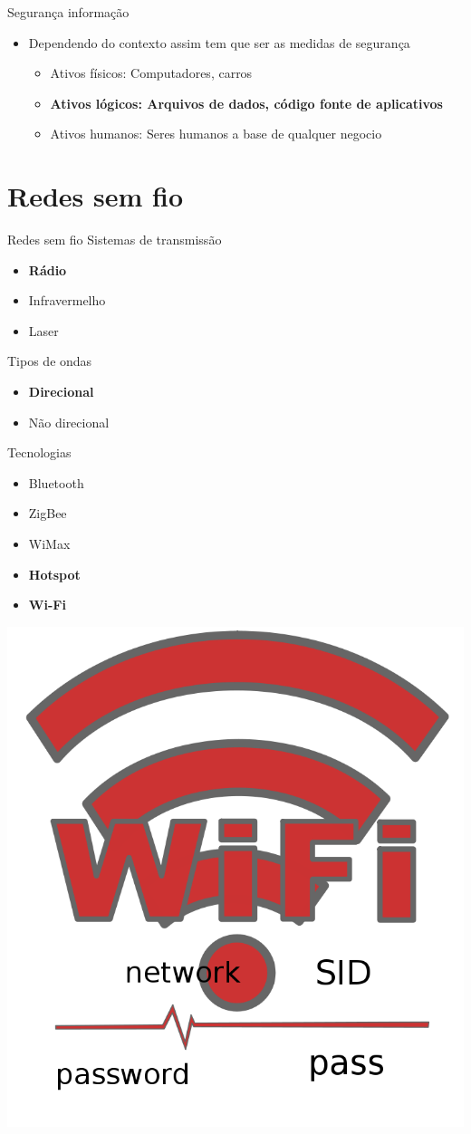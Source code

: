\documentclass[xcolor=x11names,compress]{beamer}
\renewcommand{\(}{\begin{columns}}
\renewcommand{\)}{\end{columns}}
\newcommand{\<}[1]{\begin{column}{#1}}
\renewcommand{\>}{\end{column}}
\begin{document}
\begin{frame}{Segurança informação}
\begin{itemize}
\item Dependendo do contexto assim tem que ser as medidas de segurança
\begin{itemize}
\item Ativos físicos: Computadores, carros
\item \textbf{Ativos lógicos: Arquivos de dados, código fonte de aplicativos}
\item Ativos humanos: Seres humanos a base de qualquer negocio
\end{itemize}
\end{itemize}
\end{frame}

\section{Redes sem fio}
\begin{frame}{Redes sem fio}
Sistemas de transmissão
\begin{itemize}
\item \textbf{Rádio}
\item Infravermelho
\item Laser
\end{itemize}
\end{frame}

\begin{frame}{Tipos de ondas}
\begin{itemize}
\item \textbf{Direcional}
\item Não direcional
\end{itemize}
\end{frame}

\begin{frame}{Tecnologias}
\begin{itemize}
\item Bluetooth
\item ZigBee
\item WiMax
\item \textbf{Hotspot}
\item \textbf{Wi-Fi}
\end{itemize}
\begin{center}
\includegraphics[width=0.3\linewidth]{./Pictures/free_wifi}
\end{center}
\end{frame}
\end{document}
